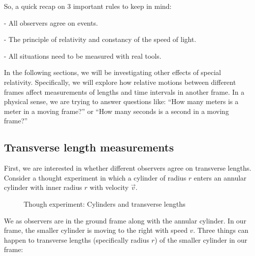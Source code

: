\documentclass[a4paper,11pt]{article}
\numberwithin{equation}{section}
\begin{document}
 So, a quick recap on 3 important rules to keep in mind:
 
 - All observers agree on events.
 
 - The principle of relativity and constancy of the speed of light.
 
 - All situations need to be measured with real tools.
 
 In the following sections, we will be investigating other effects of special relativity. Specifically, we will explore how relative motions between different frames affect measurements of lengths and time intervals in another frame. In a physical sense, we are trying to answer questions like: ``How many meters is a meter in a moving frame?'' or ``How many seconds is a second in a moving frame?''
 \subsection{Transverse length measurements}
 First, we are interested in whether different observers agree on transverse lengths. Consider a thought experiment in which a cylinder of radius $r$ enters an annular cylinder with inner radius $r$ with velocity $\vec{v}$.
 \begin{figure}[!htb]
 	\centering
 	\caption{Though experiment: Cylinders and transverse lengths}
 	\label{fig: transverse length thought experiment}
 \end{figure}
 
 \noindent We as observers are in the ground frame along with the annular cylinder. In our frame, the smaller cylinder is moving to the right with speed $v$. Three things can happen to transverse lengths (specifically radius $r$) of the smaller cylinder in our frame:
 
\end{document}
